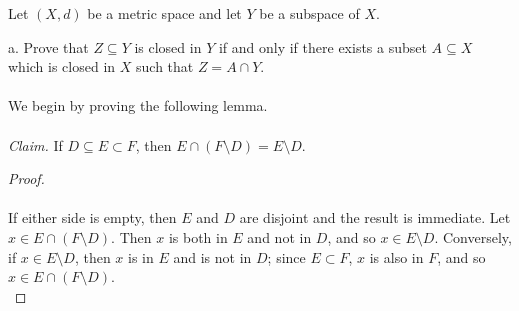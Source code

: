 Let $(X, d)$ be a metric space and let $Y$ be a subspace of $X$.

a.  Prove that $Z \subseteq Y$ is closed in $Y$ if and only if there exists a subset $A \subseteq X$ which is closed in
    $X$ such that $Z = A \cap Y$. 
\ \\\\
We begin by proving the following lemma. \ \\
\ \\
\emph{Claim.} If $D \subseteq E \subset F$, then $E \cap (F \setminus D) = E \setminus D$.
\begin{proof}\ \\\\
    If either side is empty, then $E$ and $D$ are disjoint and the result is immediate.
    Let $x \in E \cap (F \setminus D)$. Then $x$ is both in $E$ and not in $D$, and so $x \in E \setminus D$. 
    Conversely, if $x \in E \setminus D$, then $x$ is in $E$ and is not in $D$; since $E \subset F$, $x$ is also in $F$,
    and so $x \in E \cap (F \setminus D)$.
    \ \\
\end{proof}

